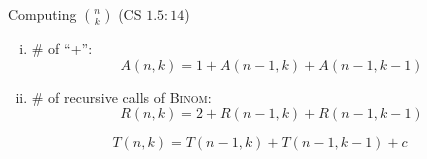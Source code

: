 
\begin{frame}{}
  \begin{exampleblock}{Computing $\binom{n}{k}$ (CS $1.5:14$)}
    
  \end{exampleblock}

  \pause
\end{frame}

\begin{frame}{}
  

  \begin{enumerate}[(i)]
    \pause
    \item \# of ``+'':
      \pause
      \[
	A(n,k) = 1 + A(n-1, k) + A(n-1, k-1)
      \]
    \pause
    \vspace{-0.60cm}
    \item \# of recursive calls of \textsc{Binom}:
      \pause
      \[
	R(n,k) = 2 + R(n-1, k) + R(n-1, k-1)
      \]
  \end{enumerate}

  \pause
  \[
    \boxed{T(n,k) = T(n-1, k) + T(n-1, k-1) + c}
  \]
\end{frame}

\begin{frame}{}
\end{frame}

\begin{frame}{}
  
\end{frame}

